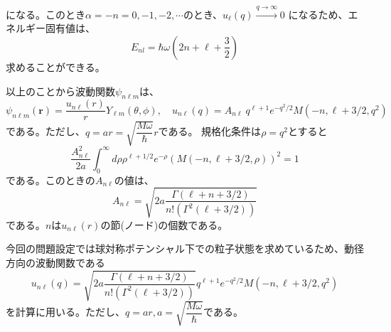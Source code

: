\documentclass[a4paper]{jsarticle}
\begin{document}
になる。このとき$\alpha=-n=0,-1,-2,\cdots$のとき、$u_\ell(q)\xrightarrow{q\rightarrow\infty}0$
になるため、エネルギー固有値は、
\begin{equation}
  E_{nl}=\hbar\omega\left(2n+\ell+\dfrac{3}{2}\right)
\end{equation}
求めることができる。\par
以上のことから波動関数$\psi_{n\ell m}$は、
\begin{equation}
  \psi_{n\ell m}(\bm{r})=\dfrac{u_{n\ell}(r)}{r}Y_{\ell m}(\theta,\phi),\quad 
  u_{n\ell}(q) = A_{n\ell}\ q^{\ell+1}e^{-q^2/2}M(-n,\ell+3/2,q^2)
\end{equation}
である。ただし、$q=a r =\sqrt{\dfrac{M\omega}{\hbar}} r$である。
規格化条件は$\rho=q^2$とすると
\begin{equation*}
  \dfrac{A_{n\ell}^2}{2a}\int_{0}^{\infty}d\rho\rho^{\ell+1/2}e^{-\rho}
  \left(M(-n,\ell+3/2,\rho)\right)^2=1
\end{equation*}
である。このときの$A_{n\ell}$の値は、
\begin{equation}
  A_{n\ell}=\sqrt{2a\dfrac{\varGamma(\ell+n+3/2)}{n!(\varGamma^2(\ell+3/2))}}
\end{equation}
である。$n$は$u_{n\ell}(r)$の節(ノード)の個数である。\par
今回の問題設定では球対称ポテンシャル下での粒子状態を求めているため、動径方向の波動関数である
\begin{equation}
  u_{n\ell}(q) = \sqrt{2a\dfrac{\varGamma(\ell+n+3/2)}{n!(\varGamma^2(\ell+3/2))}}q^{\ell+1}e^{-q^2/2}M(-n,\ell+3/2,q^2)
\end{equation}
を計算に用いる。ただし、$q=ar,a=\sqrt{\dfrac{M\omega}{\hbar}}$である。
\end{document}
